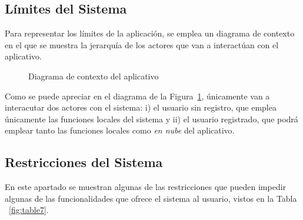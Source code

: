   \subsection{Límites del Sistema}
  Para representar los límites de la aplicación, se emplea un diagrama de contexto en el que se muestra la jerarquía de los actores 
  que van a interactúan con el aplicativo.

\begin{figure}[H]
  \centering
{}
  \caption{Diagrama de contexto del aplicativo}
   \label{fig:dom2}
\end{figure}

Como se puede apreciar en el diagrama de la Figura~\ref{fig:dom2}, únicamente van a interacutar dos actores con el sistema: i) el usuario sin registro,
que emplea únicamente las funciones locales del sistema y ii) el usuario registrado, que podrá emplear tanto las funciones locales como
\textit{en nube} del aplicativo.

\subsection{Restricciones del Sistema}

En este apartado se muestran algunas de las restricciones que pueden impedir algunas de las funcionalidades que ofrece el sistema
al usuario, vistos en la Tabla ~\ref{fig:table7}.

